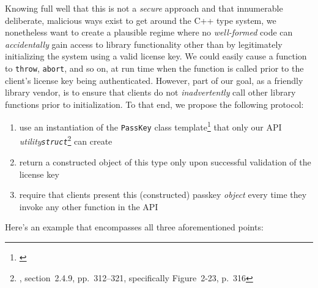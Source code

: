\noindent Knowing full well that this is not a \emph{secure} approach and that
innumerable deliberate, malicious ways exist to get around the C++ type
system, we nonetheless want to create a plausible regime where no
\emph{well-formed} code can \emph{accidentally} gain access
to library functionality other than by legitimately initializing the
system using a valid license key. We could easily cause a
function to \lstinline!throw!, \lstinline!abort!, and so on, at run time when
the function is called prior to the client's license key being
authenticated. However, part of our goal, as a friendly library vendor, is to
ensure that clients do not \emph{inadvertently} call other library
functions prior to initialization. To that end, we propose the following protocol:
\begin{enumerate}
\item{use an instantiation of the \lstinline!PassKey! class template\cprotect\footnote{\cite{mayrand15}} that only our API \emph{utility}\linebreak[4] \emph{\lstinline!struct!}\cprotect\footnote{\cite{lakos20}, section~2.4.9, pp.~312--321, specifically Figure~2-23, p.~316} can create}
\item{return a constructed object of this type only upon successful validation of the license key}
\item{require that clients present this (constructed) passkey \emph{object} every time they invoke any other function in the API}
\end{enumerate}
Here's an example that encompasses all three aforementioned points:

